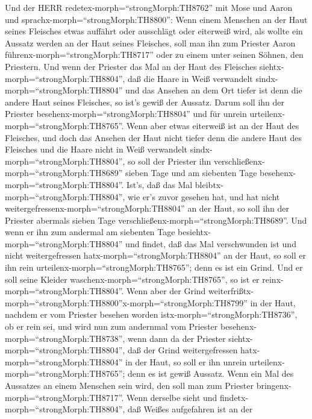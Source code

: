  Und der HERR redetex-morph=``strongMorph:TH8762'' mit Mose
und Aaron und sprachx-morph=``strongMorph:TH8800'':  Wenn
einem Menschen an der Haut seines Fleisches etwas auffährt oder
ausschlägt oder eiterweiß wird, als wollte ein Aussatz werden an der
Haut seines Fleisches, soll man ihn zum Priester Aaron
führenx-morph=``strongMorph:TH8717'' oder zu einem unter seinen Söhnen,
den Priestern.  Und wenn der Priester das Mal an der Haut
des Fleisches siehtx-morph=``strongMorph:TH8804'', daß die Haare in Weiß
verwandelt sindx-morph=``strongMorph:TH8804'' und das Ansehen an dem Ort
tiefer ist denn die andere Haut seines Fleisches, so ist's gewiß der
Aussatz. Darum soll ihn der Priester
besehenx-morph=``strongMorph:TH8804'' und für unrein
urteilenx-morph=``strongMorph:TH8765''.  Wenn aber etwas
eiterweiß ist an der Haut des Fleisches, und doch das Ansehen der Haut
nicht tiefer denn die andere Haut des Fleisches und die Haare nicht in
Weiß verwandelt sindx-morph=``strongMorph:TH8804'', so soll der Priester
ihn verschließenx-morph=``strongMorph:TH8689'' sieben Tage 
und am siebenten Tage besehenx-morph=``strongMorph:TH8804''. Ist's, daß
das Mal bleibtx-morph=``strongMorph:TH8804'', wie er's zuvor gesehen
hat, und hat nicht weitergefressenx-morph=``strongMorph:TH8804'' an der
Haut,  so soll ihn der Priester abermals sieben Tage
verschließenx-morph=``strongMorph:TH8689''. Und wenn er ihn zum andermal
am siebenten Tage besiehtx-morph=``strongMorph:TH8804'' und findet, daß
das Mal verschwunden ist und nicht weitergefressen
hatx-morph=``strongMorph:TH8804'' an der Haut, so soll er ihn rein
urteilenx-morph=``strongMorph:TH8765''; denn es ist ein Grind. Und er
soll seine Kleider waschenx-morph=``strongMorph:TH8765'', so ist er
reinx-morph=``strongMorph:TH8804''.  Wenn aber der Grind
weiterfrißtx-morph=``strongMorph:TH8800''x-morph=``strongMorph:TH8799''
in der Haut, nachdem er vom Priester besehen worden
istx-morph=``strongMorph:TH8736'', ob er rein sei, und wird nun zum
andernmal vom Priester besehenx-morph=``strongMorph:TH8738'',
 wenn dann da der Priester
siehtx-morph=``strongMorph:TH8804'', daß der Grind weitergefressen
hatx-morph=``strongMorph:TH8804'' in der Haut, so soll er ihn unrein
urteilenx-morph=``strongMorph:TH8765''; denn es ist gewiß Aussatz.
 Wenn ein Mal des Aussatzes an einem Menschen sein wird, den
soll man zum Priester bringenx-morph=``strongMorph:TH8717''.
 Wenn derselbe sieht und
findetx-morph=``strongMorph:TH8804'', daß Weißes aufgefahren ist an der
